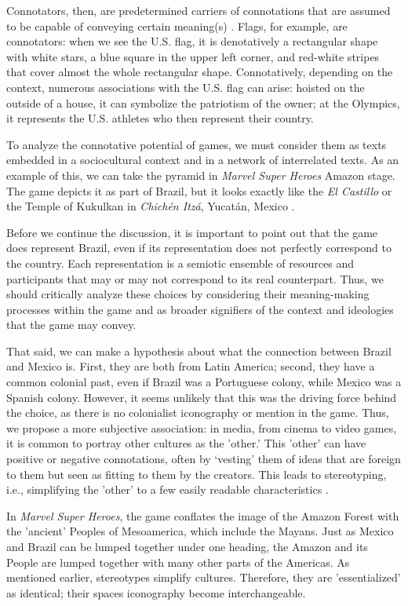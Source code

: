 \documentclass[english]{textolivre}
\begin{document}
Connotators, then, are predetermined carriers of connotations that are assumed to be capable of conveying certain meaning(s) \cite[p. 51]{machin_how_2012}. Flags, for example, are connotators: when we see the U.S. flag, it is denotatively a rectangular shape with white stars, a blue square in the upper left corner, and red-white stripes that cover almost the whole rectangular shape. Connotatively, depending on the context, numerous associations with the U.S. flag can arise: hoisted on the outside of a house, it can symbolize the patriotism of the owner; at the Olympics, it represents the U.S. athletes who then represent their country.

To analyze the connotative potential of games, we must consider them as texts embedded in a sociocultural context and in a network of interrelated texts. As an example of this, we can take the pyramid in \textit{Marvel Super Heroes} Amazon stage. The game depicts it as part of Brazil, but it looks exactly like the \textit{El Castillo} or the Temple of Kukulkan in \textit{Chichén Itzá}, Yucatán, Mexico \cite{proskouriakoff_album_2003}.

Before we continue the discussion, it is important to point out that the game does represent Brazil, even if its representation does not perfectly correspond to the country. Each representation is a semiotic ensemble of resources and participants that may or may not correspond to its real counterpart. Thus, we should critically analyze these choices by considering their meaning-making processes within the game and as broader signifiers of the context and ideologies that the game may convey.

That said, we can make a hypothesis about what the connection between Brazil and Mexico is. First, they are both from Latin America; second, they have a common colonial past, even if Brazil was a Portuguese colony, while Mexico was a Spanish colony. However, it seems unlikely that this was the driving force behind the choice, as there is no colonialist iconography or mention in the game. Thus, we propose a more subjective association: in media, from cinema to video games, it is common to portray other cultures as the 'other.' This 'other' can have positive or negative connotations, often by ‘vesting’ them of ideas that are foreign to them but seen as fitting to them by the creators. This leads to stereotyping, i.e., simplifying the 'other' to a few easily readable characteristics \cite[p. 257]{hall_spectacle_1997}.

In \textit{Marvel Super Heroes}, the game conflates the image of the Amazon Forest with the 'ancient' Peoples of Mesoamerica, which include the Mayans. Just as Mexico and Brazil can be lumped together under one heading, the Amazon and its People are lumped together with many other parts of the Americas. As mentioned earlier, stereotypes simplify cultures. Therefore, they are 'essentialized' as identical; their spaces iconography become interchangeable.
\end{document}
